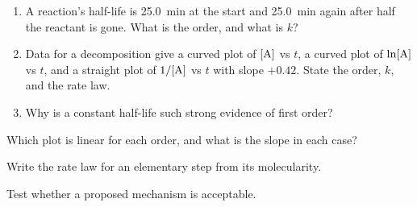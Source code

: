 \documentclass{apchem-notes}
\begin{document}
\begin{enumerate}[leftmargin=*,itemsep=0.4em]
  \item A reaction's half-life is \SI{25.0}{\minute} at the start and
        \SI{25.0}{\minute} again after half the reactant is gone. What is
        the order, and what is $k$? \workspace[2cm]
  \item Data for a decomposition give a curved plot of $[\ce{A}]$ vs $t$, a
        curved plot of $\ln[\ce{A}]$ vs $t$, and a straight plot of
        $1/[\ce{A}]$ vs $t$ with slope $+0.42$. State the order, $k$, and
        the rate law. 
  \item Why is a constant half-life such strong evidence of first order?
\end{enumerate}

\begin{exitticket}
Which plot is linear for each order, and what is the slope in each case?
\end{exitticket}


\begin{objectives}
  \item Write the rate law for an elementary step from its molecularity.
  \item Test whether a proposed mechanism is acceptable.
\end{objectives}

\end{document}
